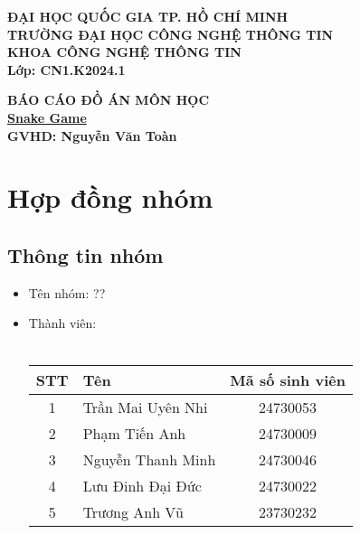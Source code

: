 \documentclass[a4paper, 12pt]{article}
\title{}
\author{}
\date{}
\begin{document}
\maketitle

\begin{center}
    \large \textbf{ĐẠI HỌC QUỐC GIA TP. HỒ CHÍ MINH}\\
    \large \textbf{TRƯỜNG ĐẠI HỌC CÔNG NGHỆ THÔNG TIN}\\
    \large \textbf{KHOA CÔNG NGHỆ THÔNG TIN}\\[2cm]
    
    \textbf{Lớp: CN1.K2024.1}\\
    \vspace{0.5cm}
    
    \vspace{2cm}
    \Large \textbf{BÁO CÁO ĐỒ ÁN MÔN HỌC}\\[0.5cm]
    \Large \textbf{\underline{Snake Game}}\\[0.5cm]
    \Large \textbf{GVHD: Nguyễn Văn Toàn}\\[0.5cm]
    \vspace{2cm}

    \vspace{1cm}
\end{center}

\newpage
\tableofcontents
\newpage

\section{Hợp đồng nhóm}
\subsection{Thông tin nhóm}
\begin{itemize}
    \item Tên nhóm: ??
    \item Thành viên:\\\\
        \begin{tabular}{|c|l|c|}
            \hline
            \textbf{STT} & \textbf{Tên} & \textbf{Mã số sinh viên} \\
            \hline
            1 & Trần Mai Uyên Nhi & 24730053 \\
            \hline
            2 & Phạm Tiến Anh & 24730009 \\
            \hline
            3 & Nguyễn Thanh Minh & 24730046 \\
            \hline
            4 & Lưu Đinh Đại Đức & 24730022 \\
            \hline
            5 & Trương Anh Vũ & 23730232 \\
            \hline
        \end{tabular}
\end{itemize}
\end{document}
